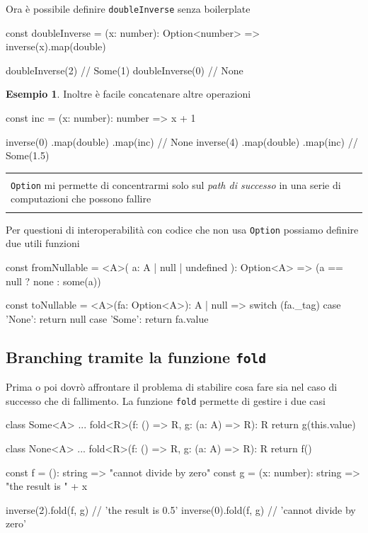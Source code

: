 \documentclass[12pt]{article}
\theoremstyle{definition}
\newtheorem{example}{Esempio}[section]
\newenvironment{demo}
    {\begin{center}
    \begin{tabular}{|p{0.9\textwidth}|}
    \hline\\
    }
    {
    \\\\\hline
    \end{tabular}
    \end{center}
    }
\newenvironment{code}
  {\vspace{0.5cm} \VerbatimEnvironment\begin{typescriptcode}}
  {\end{typescriptcode} \vspace{0.2cm}}
\begin{document}
Ora è possibile definire \texttt{doubleInverse} senza boilerplate

\begin{code}
const doubleInverse = (x: number): Option<number> =>
  inverse(x).map(double)

doubleInverse(2) // Some(1)
doubleInverse(0) // None
\end{code}

\begin{example}
Inoltre è facile concatenare altre operazioni

\begin{code}
const inc = (x: number): number => x + 1

inverse(0)
  .map(double)
  .map(inc) // None
inverse(4)
  .map(double)
  .map(inc) // Some(1.5)
\end{code}
\end{example}

\begin{demo}
\texttt{Option} mi permette di concentrarmi solo sul \emph{path di successo} in una serie di computazioni che possono fallire
\end{demo}

Per questioni di interoperabilità con codice che non usa \texttt{Option} possiamo definire due utili funzioni

\begin{code}
const fromNullable = <A>(
  a: A | null | undefined
): Option<A> => (a == null ? none : some(a))

const toNullable = <A>(fa: Option<A>): A | null => {
  switch (fa._tag) {
    case 'None':
      return null
    case 'Some':
      return fa.value
  }
}
\end{code}

\subsection{Branching tramite la funzione \texttt{fold}}

Prima o poi dovrò affrontare il problema di stabilire cosa fare sia nel caso di successo che di fallimento.
La funzione \texttt{fold} permette di gestire i due casi

\begin{code}
class Some<A> {
  ...
  fold<R>(f: () => R, g: (a: A) => R): R {
    return g(this.value)
  }
}

class None<A> {
  ...
  fold<R>(f: () => R, g: (a: A) => R): R {
    return f()
  }
}

const f = (): string => "cannot divide by zero"
const g = (x: number): string => "the result is " + x

inverse(2).fold(f, g) // 'the result is 0.5'
inverse(0).fold(f, g) // 'cannot divide by zero'
\end{code}
\end{document}
